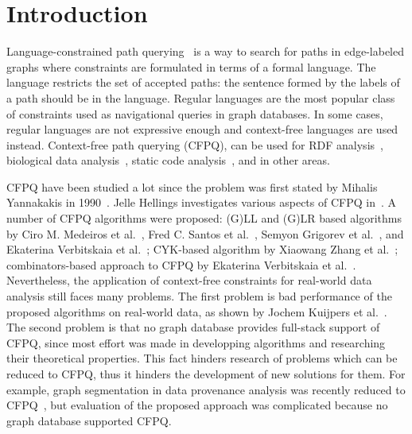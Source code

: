 \section{Introduction}

Language-constrained path querying~\cite{doi:10.1137/S0097539798337716} is a way to search for paths in edge-labeled graphs where constraints are formulated in terms of a formal language.
The language restricts the set of accepted paths: the sentence formed by the labels of a path should be in the language.
Regular languages are the most popular class of constraints used as navigational queries in graph databases.
In some cases, regular languages are not expressive enough and context-free languages are used instead.
Context-free path querying (CFPQ), can be used for RDF analysis~\cite{10.1007/978-3-319-46523-4_38}, biological data analysis~\cite{SubgraphQueriesbyContextfreeGrammars}, static code analysis~\cite{Zheng,10.1145/373243.360208}, and in other areas.

CFPQ have been studied a lot since the problem was first stated by Mihalis Yannakakis in 1990~\cite{Yannakakis}.
Jelle Hellings investigates various aspects of CFPQ in~\cite{hellingsPathQuerying,hellingsRelational,DBLP:journals/corr/Hellings15}.
A number of CFPQ algorithms were proposed: (G)LL and (G)LR based algorithms by Ciro M. Medeiros et al.~\cite{Medeiros:2018:EEC:3167132.3167265}, Fred C. Santos et al.~\cite{10.1007/978-3-319-91662-0_17}, Semyon Grigorev et al.~\cite{Grigorev:2017:CPQ:3166094.3166104}, and Ekaterina Verbitskaia et al.~\cite{10.1007/978-3-319-41579-6_22}; CYK-based algorithm by Xiaowang Zhang et al.~\cite{10.1007/978-3-319-46523-4_38}; combinators-based approach to CFPQ by Ekaterina Verbitskaia et al.~\cite{Verbitskaia:2018:PCC:3241653.3241655}.
Nevertheless, the application of context-free constraints for real-world data analysis still faces many problems.
The first problem is bad performance of the proposed algorithms on real-world data, as shown by Jochem Kuijpers et al.~\cite{Kuijpers:2019:ESC:3335783.3335791}.
The second problem is that no graph database provides full-stack support of CFPQ, since most effort was made in developping algorithms and researching their theoretical properties.
This fact hinders research of problems which can be reduced to CFPQ, thus it hinders the development of new solutions for them.
For example, graph segmentation in data provenance analysis was recently reduced to CFPQ~\cite{8731467}, but evaluation of the proposed approach was complicated because no graph database supported CFPQ.

